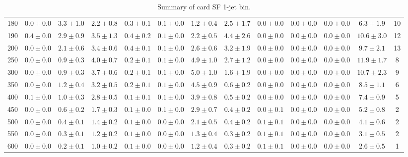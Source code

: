 \begin{table}
{\begin{center}
\begin{tabular}{l | c c | c c c c c c c c  | c c}
180 & $0.0\pm0.0$ & $3.3\pm1.0$ & $2.2\pm0.8$ & $0.3\pm0.1$ & $0.1\pm0.0$ & $1.2\pm0.4$ & $2.5\pm1.7$ & $0.0\pm0.0$ & $0.0\pm0.0$ & $0.0\pm0.0$ & $6.3\pm1.9$ & 10 \\
190 & $0.4\pm0.0$ & $2.9\pm0.9$ & $3.5\pm1.3$ & $0.4\pm0.2$ & $0.1\pm0.0$ & $2.2\pm0.5$ & $4.4\pm2.6$ & $0.0\pm0.0$ & $0.0\pm0.0$ & $0.0\pm0.0$ & $10.6\pm3.0$ & 12 \\
200 & $0.0\pm0.0$ & $2.1\pm0.6$ & $3.4\pm0.6$ & $0.4\pm0.1$ & $0.1\pm0.0$ & $2.6\pm0.6$ & $3.2\pm1.9$ & $0.0\pm0.0$ & $0.0\pm0.0$ & $0.0\pm0.0$ & $9.7\pm2.1$ & 13 \\
250 & $0.0\pm0.0$ & $0.9\pm0.3$ & $4.0\pm0.7$ & $0.2\pm0.1$ & $0.1\pm0.0$ & $4.9\pm1.0$ & $2.7\pm1.2$ & $0.0\pm0.0$ & $0.0\pm0.0$ & $0.0\pm0.0$ & $11.9\pm1.7$ & 8 \\
300 & $0.0\pm0.0$ & $0.9\pm0.3$ & $3.7\pm0.6$ & $0.2\pm0.1$ & $0.1\pm0.0$ & $5.0\pm1.0$ & $1.6\pm1.9$ & $0.0\pm0.0$ & $0.0\pm0.0$ & $0.0\pm0.0$ & $10.7\pm2.3$ & 9 \\
350 & $0.0\pm0.0$ & $1.2\pm0.4$ & $3.2\pm0.5$ & $0.2\pm0.1$ & $0.1\pm0.0$ & $4.5\pm0.9$ & $0.6\pm0.2$ & $0.0\pm0.0$ & $0.0\pm0.0$ & $0.0\pm0.0$ & $8.5\pm1.1$ & 6 \\
400 & $0.1\pm0.0$ & $1.0\pm0.3$ & $2.8\pm0.5$ & $0.1\pm0.1$ & $0.1\pm0.0$ & $3.9\pm0.8$ & $0.5\pm0.2$ & $0.0\pm0.0$ & $0.0\pm0.0$ & $0.0\pm0.0$ & $7.4\pm0.9$ & 5 \\
450 & $0.0\pm0.0$ & $0.6\pm0.2$ & $1.7\pm0.3$ & $0.1\pm0.0$ & $0.1\pm0.0$ & $2.9\pm0.7$ & $0.4\pm0.2$ & $0.0\pm0.1$ & $0.0\pm0.0$ & $0.0\pm0.0$ & $5.2\pm0.8$ & 2 \\
500 & $0.0\pm0.0$ & $0.4\pm0.1$ & $1.4\pm0.2$ & $0.1\pm0.0$ & $0.0\pm0.0$ & $2.1\pm0.5$ & $0.4\pm0.2$ & $0.1\pm0.1$ & $0.0\pm0.0$ & $0.0\pm0.0$ & $4.1\pm0.6$ & 2 \\
550 & $0.0\pm0.0$ & $0.3\pm0.1$ & $1.2\pm0.2$ & $0.1\pm0.0$ & $0.0\pm0.0$ & $1.3\pm0.4$ & $0.3\pm0.2$ & $0.1\pm0.1$ & $0.0\pm0.0$ & $0.0\pm0.0$ & $3.1\pm0.5$ & 2 \\
600 & $0.0\pm0.0$ & $0.2\pm0.1$ & $1.0\pm0.2$ & $0.1\pm0.0$ & $0.0\pm0.0$ & $1.2\pm0.4$ & $0.3\pm0.2$ & $0.1\pm0.1$ & $0.0\pm0.0$ & $0.0\pm0.0$ & $2.6\pm0.5$ & 1 \\
\hline
\end{tabular}
\end{center}
}
\caption{Summary of card SF 1-jet bin.}
\end{table}
